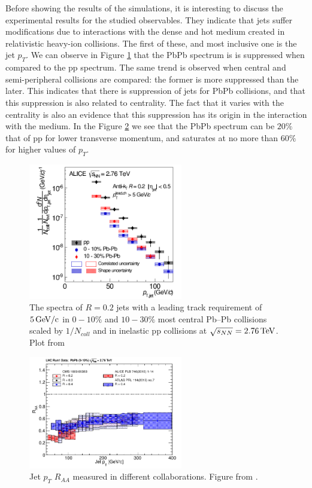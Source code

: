 
Before showing the results of the simulations, it is interesting to discuss the experimental results for the studied observables. They indicate that jets suffer modifications due to interactions with the dense and hot medium created in relativistic heavy-ion collisions. The first of these, and most inclusive one is the jet $p_T$. We can observe in Figure \ref{exp_jet_pt} that the PbPb spectrum is is suppressed when compared to the pp spectrum. The same trend is observed when central and semi-peripheral collisions are compared: the former is more suppressed than the later. This indicates that there is suppression of jets for PbPb collisions, and that this suppression is also related to centrality. The fact that it varies with the centrality is also an evidence that this suppression has its origin in the interaction with the medium. In the Figure \ref{exp_jet_pt_raa} we see that the PbPb spectrum can be $20\%$ that of pp for lower transverse momentum, and saturates at no more than $60\%$ for higher values of $p_T$.

\begin{figure}
\includegraphics[width=0.6\textwidth]{images/exp_jet_pt.png}
\caption[Experimental Jet $p_T$]{The spectra of $R = 0.2$ jets with a leading track requirement of $5 \, {\rm GeV/c}$ in $0-10\%$ and $10-30\%$ most central Pb–Pb collisions scaled by $1/N_{coll}$ and in inelastic pp collisions at $\sqrt{s_{NN}} = 2.76 \, {\rm TeV}$. Plot from \cite{alice_collaboration_measurement_2015}}
\label{exp_jet_pt}
\end{figure}

\begin{figure}
\includegraphics[width=0.6\textwidth]{images/exp_jet_pt_raa.png}
\caption[Experimental Jet $p_T$ $R_{AA}$]{Jet $p_T$ $R_{AA}$ measured in different collaborations. Figure from \cite{connors_review_2017}.}
\label{exp_jet_pt_raa}
\end{figure}

